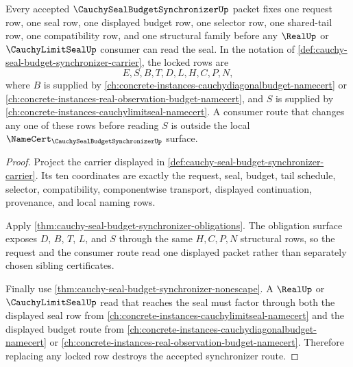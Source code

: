 \begin{theorem}
\label{thm:cauchy-seal-budget-synchronizer-shared-budget-lock}
Every accepted $\CauchySealBudgetSynchronizerUp$ packet fixes one request row, one seal row, one displayed budget row, one selector row, one shared-tail row, one compatibility row, and one structural family before any $\RealUp$ or $\CauchyLimitSealUp$ consumer can read the seal. In the notation of \autoref{def:cauchy-seal-budget-synchronizer-carrier}, the locked rows are
$$
E,S,B,T,D,L,H,C,P,N,
$$
where $B$ is supplied by \autoref{ch:concrete-instances-cauchydiagonalbudget-namecert} or \autoref{ch:concrete-instances-real-observation-budget-namecert}, and $S$ is supplied by \autoref{ch:concrete-instances-cauchylimitseal-namecert}. A consumer route that changes any one of these rows before reading $S$ is outside the local $\NameCert_{\CauchySealBudgetSynchronizerUp}$ surface.
\end{theorem}
\begin{proof}
Project the carrier displayed in \autoref{def:cauchy-seal-budget-synchronizer-carrier}. Its ten coordinates are exactly the request, seal, budget, tail schedule, selector, compatibility, componentwise transport, displayed continuation, provenance, and local naming rows.

Apply \autoref{thm:cauchy-seal-budget-synchronizer-obligations}. The obligation surface exposes $D$, $B$, $T$, $L$, and $S$ through the same $H,C,P,N$ structural rows, so the request and the consumer route read one displayed packet rather than separately chosen sibling certificates.

Finally use \autoref{thm:cauchy-seal-budget-synchronizer-nonescape}. A $\RealUp$ or $\CauchyLimitSealUp$ read that reaches the seal must factor through both the displayed seal row from \autoref{ch:concrete-instances-cauchylimitseal-namecert} and the displayed budget route from \autoref{ch:concrete-instances-cauchydiagonalbudget-namecert} or \autoref{ch:concrete-instances-real-observation-budget-namecert}. Therefore replacing any locked row destroys the accepted synchronizer route.
\end{proof}

